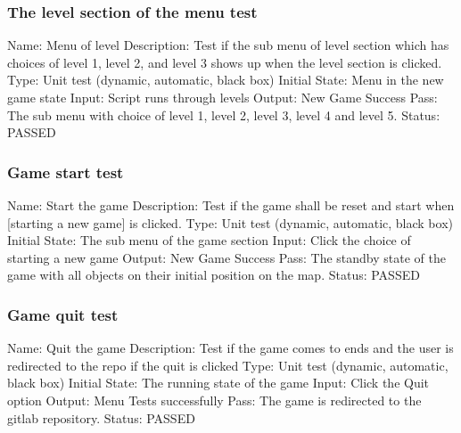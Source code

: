 \documentclass{article}
\begin{document}
\subsubsection{The level section of the menu test}
\label{sec:3.1.5}
Name:  Menu of level\newline
Description: Test if the sub menu of level section which has choices of level 
1, level 2, and level 3 shows up when the level section is clicked. \newline
Type: Unit test (dynamic, automatic, black box) \newline
Initial State: Menu in the new game state \newline
Input: Script runs through levels\newline
Output: New Game Success\newline
Pass: The sub menu with choice of level 1, level 2, level 3, level 4 and level 5. \newline
\newline Status: PASSED

\subsubsection{Game start test}
\label{sec:3.1.6}
Name:  Start the game\newline
Description: Test if the game shall be reset and start when [starting a new 
game] is clicked. \newline
Type: Unit test (dynamic, automatic, black box) \newline
Initial State:  The sub menu of the game section \newline
Input: Click the choice of starting a new game \newline
Output: New Game Success\newline
Pass: The standby state of the game with all objects on their initial position 
on the map. \newline
\newline Status: PASSED

\subsubsection{Game quit test}
\label{sec:3.1.7}
Name:  Quit the game\newline
Description: Test if the game comes to ends and the user is redirected to
 the repo if the quit is clicked \newline
Type: Unit test (dynamic, automatic, black box) \newline
Initial State:  The running state of the game \newline
Input: Click the Quit option\newline
Output: Menu Tests successfully \newline
Pass: The game is redirected to the gitlab repository.  \newline
\newline Status: PASSED
\end{document}
